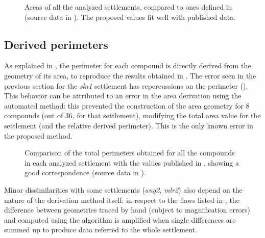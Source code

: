             \begin{figure}[H]
                \centering
                \begin{tikzpicture}
                    
                \end{tikzpicture}
                \caption[Areas of all the analyzed settlements compared with ones published in \cite{laterza}]{Areas of all the analyzed settlements, compared to ones defined in \cite{laterza} (source data in ). The proposed values fit well with published data.}
                \label{fig:graph-area}
            \end{figure}

        \subsection{Derived perimeters}
            
            As explained in , the perimeter for each compound is directly derived from the geometry of its area, to reproduce the results obtained in \cite{laterza}. The error seen in the previous section for the \emph{sln1} settlement has repercussions on the perimeter (). This behavior can be attributed to an error in the area derivation using the automated method: this prevented the construction of the area geometry for 8 compounds (out of 36, for that settlement), modifying the total area value for the settlement (and the relative derived perimeter). This is the only known error in the proposed method.

            \begin{figure}[H]
                \centering
                \begin{tikzpicture}
                    
                \end{tikzpicture}
                \caption[Comparison of published perimeters with ones obtained with the proposed method]{Comparison of the total perimeters obtained for all the compounds in each analyzed settlement with the values published in \cite{laterza}, showing a good correspondence (source data in ).}
                \label{fig:graph-perim}
            \end{figure}

            Minor dissimilarities with some settlements (\emph{ang2}, \emph{mlr2}) also depend on the nature of the derivation method itself: in respect to the flaws listed in , the difference between geometries traced by hand (subject to magnification errors) and computed using the algorithm is amplified when single differences are summed up to produce data referred to the whole settlement.

